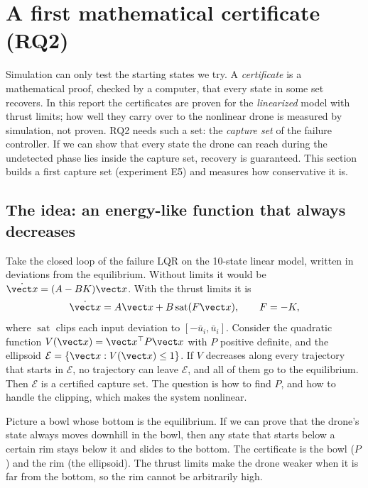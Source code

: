 \section{A first mathematical certificate (RQ2)}\label{sec:certificate}
Simulation can only test the starting states we try. A \emph{certificate} is a mathematical proof, checked by a computer, that every state in some set recovers. In this report the certificates are proven for the \emph{linearized} model with thrust limits; how well they carry over to the nonlinear drone is measured by simulation, not proven. RQ2 needs such a set: the \emph{capture set} of the failure controller. If we can show that every state the drone can reach during the undetected phase lies inside the capture set, recovery is guaranteed. This section builds a first capture set (experiment E5) and measures how conservative it is.

\subsection{The idea: an energy-like function that always decreases}
Take the closed loop of the failure LQR on the 10-state linear model, written in deviations from the equilibrium. Without limits it would be $\dot{\vect x} = (A - BK)\vect x$. With the thrust limits it is
\begin{equation}
  \dot{\vect x} = A\vect x + B\operatorname{sat}(F\vect x), \qquad F = -K,
\end{equation}
where $\operatorname{sat}$ clips each input deviation to $[-\bar u_i, \bar u_i]$. Consider the quadratic function $V(\vect x) = \vect x^\top P\vect x$ with $P$ positive definite, and the ellipsoid $\mathcal E = \{\vect x : V(\vect x)\le1\}$. If $V$ decreases along every trajectory that starts in $\mathcal E$, no trajectory can leave $\mathcal E$, and all of them go to the equilibrium. Then $\mathcal E$ is a certified capture set. The question is how to find $P$, and how to handle the clipping, which makes the system nonlinear.

\begin{plain}
Picture a bowl whose bottom is the equilibrium. If we can prove that the drone's state always moves downhill in the bowl, then any state that starts below a certain rim stays below it and slides to the bottom. The certificate is the bowl ($P$) and the rim (the ellipsoid). The thrust limits make the drone weaker when it is far from the bottom, so the rim cannot be arbitrarily high.
\end{plain}

